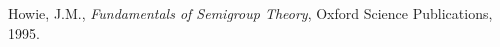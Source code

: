 \begin{thebibliography}{99}

  Howie, J.M.,
  \textit{Fundamentals of Semigroup Theory},
  Oxford Science Publications,
  1995.

\end{thebibliography}
